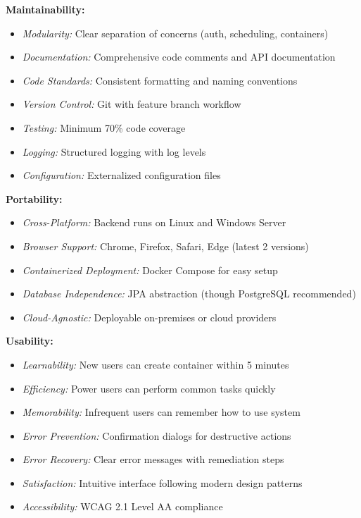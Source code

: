 \documentclass[12pt,a4paper]{article}
\begin{document}
\textbf{Maintainability:}

\begin{itemize}
    \item \textit{Modularity:} Clear separation of concerns (auth, scheduling, containers)
    \item \textit{Documentation:} Comprehensive code comments and API documentation
    \item \textit{Code Standards:} Consistent formatting and naming conventions
    \item \textit{Version Control:} Git with feature branch workflow
    \item \textit{Testing:} Minimum 70\% code coverage
    \item \textit{Logging:} Structured logging with log levels
    \item \textit{Configuration:} Externalized configuration files
\end{itemize}

\textbf{Portability:}

\begin{itemize}
    \item \textit{Cross-Platform:} Backend runs on Linux and Windows Server
    \item \textit{Browser Support:} Chrome, Firefox, Safari, Edge (latest 2 versions)
    \item \textit{Containerized Deployment:} Docker Compose for easy setup
    \item \textit{Database Independence:} JPA abstraction (though PostgreSQL recommended)
    \item \textit{Cloud-Agnostic:} Deployable on-premises or cloud providers
\end{itemize}
\textbf{Usability:}

\begin{itemize}
    \item \textit{Learnability:} New users can create container within 5 minutes
    \item \textit{Efficiency:} Power users can perform common tasks quickly
    \item \textit{Memorability:} Infrequent users can remember how to use system
    \item \textit{Error Prevention:} Confirmation dialogs for destructive actions
    \item \textit{Error Recovery:} Clear error messages with remediation steps
    \item \textit{Satisfaction:} Intuitive interface following modern design patterns
    \item \textit{Accessibility:} WCAG 2.1 Level AA compliance
\end{itemize}
\end{document}
